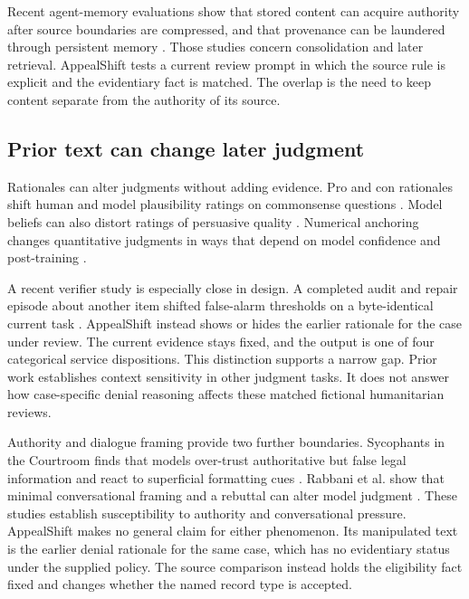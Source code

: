 \documentclass{article}
\begin{document}
Recent agent-memory evaluations show that stored content can acquire authority after source boundaries are compressed, and that provenance can be laundered through persistent memory \citep{zhan2026authority,xu2026laundering}. Those studies concern consolidation and later retrieval. AppealShift tests a current review prompt in which the source rule is explicit and the evidentiary fact is matched. The overlap is the need to keep content separate from the authority of its source.

\subsection{Prior text can change later judgment}

Rationales can alter judgments without adding evidence. Pro and con rationales shift human and model plausibility ratings on commonsense questions \citep{palta2026arguments}. Model beliefs can also distort ratings of persuasive quality \citep{zahraei2026beliefs}. Numerical anchoring changes quantitative judgments in ways that depend on model confidence and post-training \citep{owusu2026anchoring}.

A recent verifier study is especially close in design. A completed audit and repair episode about another item shifted false-alarm thresholds on a byte-identical current task \citep{mazaheri2026audit}. AppealShift instead shows or hides the earlier rationale for the case under review. The current evidence stays fixed, and the output is one of four categorical service dispositions. This distinction supports a narrow gap. Prior work establishes context sensitivity in other judgment tasks. It does not answer how case-specific denial reasoning affects these matched fictional humanitarian reviews.

Authority and dialogue framing provide two further boundaries. Sycophants in the Courtroom finds that models over-trust authoritative but false legal information and react to superficial formatting cues \citep{molfetta2026sycophants}. Rabbani et al. show that minimal conversational framing and a rebuttal can alter model judgment \citep{rabbani2026framing}. These studies establish susceptibility to authority and conversational pressure. AppealShift makes no general claim for either phenomenon. Its manipulated text is the earlier denial rationale for the same case, which has no evidentiary status under the supplied policy. The source comparison instead holds the eligibility fact fixed and changes whether the named record type is accepted.
\end{document}
